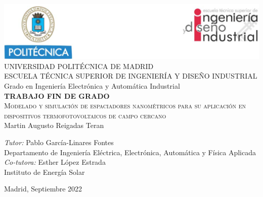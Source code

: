 \begin{titlepage}
\begin{center}
\includegraphics[width=1\textwidth]{figuras/cabecera.png}  \\[0.7 cm]

\LARGE UNIVERSIDAD POLITÉCNICA DE MADRID \\ [1 cm]

\LARGE ESCUELA TÉCNICA SUPERIOR DE INGENIERÍA Y DISEÑO INDUSTRIAL \\ [1 cm]

\LARGE Grado en Ingeniería Electrónica y Automática Industrial\\ [.7 cm]

\LARGE \textbf{TRABAJO FIN DE GRADO}\\[0.7 cm]

\Huge \textsc{Modelado y simulación de espaciadores nanométricos para su aplicación en dispositivos termofotovoltaicos de campo cercano}\\[1 cm]

\LARGE Martin Augusto Reigadas Teran \\[0.7 cm]
\begin{flushleft}
\Large
\emph{Tutor:} {Pablo García-Linares Fontes}\\
{ Departamento de Ingeniería Eléctrica, Electrónica, Automática y Física Aplicada}\\[.2cm]
\emph{Co-tutora:} Esther López Estrada\\
{ Instituto de Energía Solar}\\
\end{flushleft}

\vfill

{\large Madrid, Septiembre 2022}
\cleardoublepage 
\end{center}
\end{titlepage}
